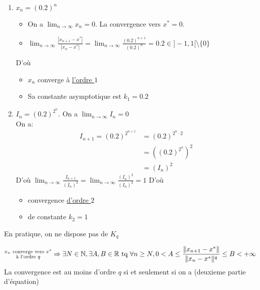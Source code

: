 \begin{eg}
    \begin{enumerate}
        \item 
   $x_n = (0.2)^n$ 
   \begin{itemize}
       \item On a $\lim_{n \to \infty} x_n = 0$. La convergence vers $x^* = 0$.
       \item  $\lim_{n \to \infty} \frac{|x_{n+1} - x^*|}{|x_n - x^*|} = \lim_{n \to \infty} \frac{(0.2)^{n+1}}{(0.2)^n} = 0.2 \in ]-1, 1[ \setminus \{0\}$
   \end{itemize}
   D'où
   \begin{itemize}
       \item $x_n$ converge à \underline{l'ordre $1$} 
       \item Sa constante asymptotique est \underline{$k_1 = 0.2$}
   \end{itemize}
   \item
       $I_n = (0.2)^{2^n}$. On a  $\lim_{n \to \infty} I_n = 0$\\
       On a:
       \begin{align*}
           I_{n+1} = (0.2)^{2^{n+1}} &= (0.2)^{2^n \cdot 2}\\
                                     &= \left( (0.2)^{2^n} \right)^2\\
                                     &= \left( I_n \right)^2
       \end{align*}
       D'où $\lim_{n \to \infty} \frac{I_{n+1}}{\left( I_n \right)^2} = \lim_{n \to \infty} \frac{\left( I_n \right)^2}{\left( I_n \right)^2} = 1$
       D'où
       \begin{itemize}
           \item convergence \underline{d'ordre $2$}
           \item de constante $k_2 = 1$
       \end{itemize}
\end{enumerate}
\end{eg}
En pratique, on ne dispose pas de $K_q$
 \begin{definition}
    \[
        \substack{x_n \text{ converge vers } x^*\\\text{à l'ordre } q} \Rightarrow \exists N \in \mathbb{N}, \exists A,B \in \mathbb{R} \text{ tq } \forall n \ge N, 0 < A \le \frac{\|x_{n+1} - x^*\|}{\|x_n - x^*\|^q} \le B < +\infty
    \] 
    La convergence est au moins d'ordre $q$ si et seulement si on a (deuxieme partie d'équation)
\end{definition}

